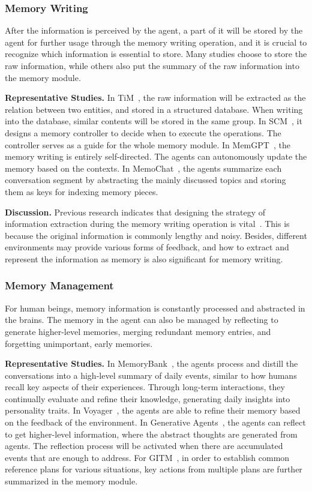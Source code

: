 \documentclass{article}
\theoremstyle{definition}
\theoremstyle{theorem}
\theoremstyle{proof}
\theoremstyle{remark}
\begin{document}
	\subsubsection{Memory Writing}
	
	After the information is perceived by the agent, a part of it will be stored by the agent for further usage through the memory writing operation, and it is crucial to recognize which information is essential to store.
	Many studies choose to store the raw information, while others also put the summary of the raw information into the memory module. 
	
	
	\textbf{Representative Studies.}
	In TiM~\cite{tim}, the raw information will be extracted as the relation between two entities, and stored in a structured database. When writing into the database, similar contents will be stored in the same group.
	In SCM~\cite{scm}, it designs a memory controller to decide when to execute the operations. The controller serves as a guide for the whole memory module.
	In MemGPT~\cite{memgpt}, the memory writing is entirely self-directed. The agents can autonomously update the memory based on the contexts.
	In MemoChat~\cite{memochat}, the agents summarize each conversation segment by abstracting the mainly discussed topics and storing them as keys for indexing memory pieces.
	
	
	\textbf{Discussion.}
	Previous research indicates that designing the strategy of information extraction during the memory writing operation is vital~\cite{memochat}. This is because the original information is commonly lengthy and noisy. Besides, different environments may provide various forms of feedback, and how to extract and represent the information as memory is also significant for memory writing.
	
	\subsubsection{Memory Management}
	For human beings, memory information is constantly processed and abstracted in the brains. The memory in the agent can also be managed by reflecting to generate higher-level memories, merging redundant memory entries, and forgetting unimportant, early memories.
	
	\textbf{Representative Studies.}
	In MemoryBank~\cite{memorybank}, the agents process and distill the conversations into a high-level summary of daily events, similar to how humans recall key aspects of their experiences.
	Through long-term interactions, they continually evaluate and refine their knowledge, generating daily insights into personality traits.
	In Voyager~\cite{voyager}, the agents are able to refine their memory based on the feedback of the environment.
	In Generative Agents~\cite{generative_agents}, the agents can reflect to get higher-level information, where the abstract thoughts are generated from agents. The reflection process will be activated when there are accumulated events that are enough to address.
	For GITM~\cite{gitm}, in order to establish common reference plans for various situations, key actions from multiple plans are further summarized in the memory module.
	
\end{document}
